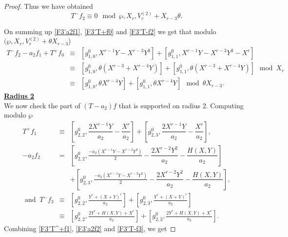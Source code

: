 \documentclass[11pt, reqno]{amsart}
\numberwithin{equation}{section}
\theoremstyle{definition}
\theoremstyle{remark}
\theoremstyle{definition}
\theoremstyle{remark}
\theoremstyle{remark}
\begin{document}
\begin{proof}
Thus we have obtained
\begin{equation}\label{F3'T-f2}
   T^{-}f_{2}\equiv 0 \mod \wp,X_{r}, V_{r}^{(2)} + X_{r-3}\theta.
\end{equation}

On summing up \eqref{F3'a2f1}, \eqref{F3'T+f0} and \eqref{F3'T-f2} we get that modulo $( \wp,X_{r}, V_{r}^{(2)}+ \theta
X_{r-3}$)
\begin{eqnarray}
T^{-}f_{2} -a_{2}f_{1} + T^{+}f_{0} &\equiv &\left[g_{1,0}^{0}, X^{r-1}Y-X^{r-3}Y^3 \right] + \left[g_{1,1}^{0},X^{r-1}Y-X^{r-3}Y^3-X^{r}\right]\nonumber\\
&\equiv &\left[g_{1,0}^{0}, \theta(X^{r-3}+X^{r-4}Y) \right]+ \left[g_{1,1}^{0},\theta(X^{r-3}+X^{r-4}Y)\right]\mod X_r  \nonumber\\
&\equiv& \left[g_{1,0}^{0}, \theta X^{r-4}Y\right] + \left[g_{1,1}^{0},\theta X^{r-4}Y\right]\mod %
\theta X_{r-3}. \label{sl1F3'rad1}
\end{eqnarray}
\noindent\underline{\textbf{Radius 2}}\\
We now check the part of $(T-a_{2})f$ that is supported on radius $2$. Computing modulo $\wp$
\begin{eqnarray}\label{F3'T^+f1}
T^{+}f_{1} &\equiv& \left[g_{2,2}^{0}, \dfrac{2X^{r-1}Y}{a_{2}}-\dfrac{X^{r}}{a_{2}}\right] + \left[g_{2,3}^{0}, \dfrac{2X^{r-1}Y}{a_{2}}-\dfrac{X^{r}}{a_{2}}\right] ,\\
-a_{2}f_{2} &=& \left[g_{2,2}^{0}, \frac{-a_{2}(X^{r-1}Y-X^{r-2}Y^2)}{2} -\dfrac{2X^{r-2}Y^2}{a_{2}}-\dfrac{H(X,Y)}{a_{2}} \right] \nonumber\\
&& + \left[g_{2,3}^{0},\frac{-a_{2}(X^{r-1}Y-X^{r-2}Y^2)}{2} -\dfrac{2X^{r-2}Y^2}{a_{2}}-\dfrac{H(X,Y)}{a_{2}} \right], \label{F3'a2f2}\\
\text{ and } \:T^{-}f_{3}&\equiv& \left[g_{2,2}^{0}, \frac{Y^{r}+(X+Y)^{r}}{a_{2}}\right] + \left[g_{2,3}^{0}, \frac{Y^{r}+(X+Y)^{r}}{a_{2}}\right] \nonumber\\
&\equiv&\left[g_{2,2}^{0}, \frac{2Y^{r}+ H(X,Y)+X^{r}}{a_{2}}\right] + \left[g_{2,3}^{0},\frac{2Y^{r}+ H(X,Y)+X^{r}}{a_{2}}\right].\label{F3'T-f3}
\end{eqnarray}
Combining \eqref{F3'T^+f1}, \eqref{F3'a2f2} and \eqref{F3'T-f3}, we get

\end{proof}
\end{document}
